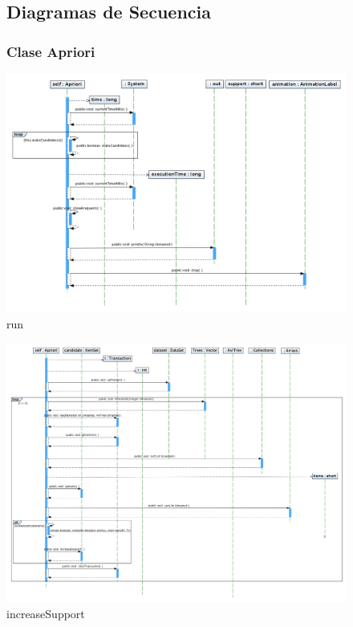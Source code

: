 \begin{figure}
\subsection{Diagramas de Secuencia}
\subsubsection{Clase Apriori}
\centering
\includegraphics[width=1.2\textwidth]{imgsSecuencia/Apriori/run.png}
\caption{run}
\end{figure}
\newpage
\begin{figure}
\centering
\includegraphics[width=1.2\textwidth]{imgsSecuencia/Apriori/increaseSupport.png}
\caption{increaseSupport}
\end{figure}
